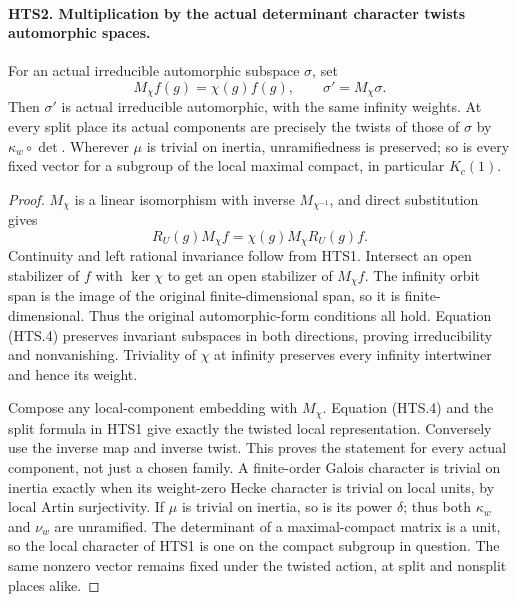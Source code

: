 \documentclass[11pt,a4paper]{article}
\numberwithin{equation}{section}
\theoremstyle{remark}\newtheorem{remark}[theorem]{Remark}
\begin{document}
\paragraph{HTS2. Multiplication by the actual determinant character twists automorphic spaces.}
\label{claim:HTS2}
For an actual irreducible automorphic subspace $\sigma$, set
\[
          M_\chi f(g)=\chi(g)f(g),\qquad \sigma'=M_\chi\sigma.
                                                               \tag{HTS.3}
\]
Then $\sigma'$ is actual irreducible automorphic, with the same
infinity weights.  At every split place its actual components
are precisely the twists of those of $\sigma$ by
$\kappa_w\circ\det$.  Wherever $\mu$ is trivial on inertia,
unramifiedness is preserved; so is every fixed vector for a
subgroup of the local maximal compact, in particular $K_c(1)$.
\begin{proof}
$M_\chi$ is a linear isomorphism with inverse $M_{\chi^{-1}}$,
and direct substitution gives
\[
          R_U(g)M_\chi f=\chi(g)M_\chi R_U(g)f.                 \tag{HTS.4}
\]
Continuity and left rational invariance follow from HTS1.
Intersect an open stabilizer of $f$ with $\ker\chi$ to get
an open stabilizer of $M_\chi f$.  The infinity orbit span
is the image of the original finite-dimensional span, so it
is finite-dimensional.  Thus the original automorphic-form
conditions all hold.  Equation (HTS.4) preserves invariant
subspaces in both directions, proving irreducibility and
nonvanishing.  Triviality of $\chi$ at infinity preserves
every infinity intertwiner and hence its weight.

Compose any local-component embedding with $M_\chi$.
Equation (HTS.4) and the split formula in HTS1 give exactly
the twisted local representation.  Conversely use the inverse
map and inverse twist.  This proves the statement for every
actual component, not just a chosen family.  A finite-order
Galois character is trivial on inertia exactly when its
weight-zero Hecke character is trivial on local units, by
local Artin surjectivity.  If $\mu$ is trivial on inertia,
so is its power $\delta$; thus both $\kappa_w$ and $\nu_w$
are unramified.  The determinant of a maximal-compact matrix
is a unit, so the local character of HTS1 is one on the
compact subgroup in question.  The same nonzero vector
remains fixed under the twisted action, at split and nonsplit
places alike.
\end{proof}

\end{document}
